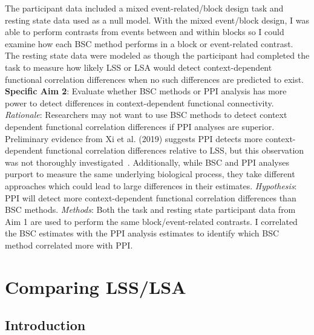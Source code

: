 \documentclass[phd,appendix,figures]{uithesis}
\begin{document}
The participant data included a mixed event-related/block design task and resting
state data used as a null model.
With the mixed event/block design, I was able to perform contrasts from events
between and within blocks so I could examine how each BSC method performs
in a block or event-related contrast.
The resting state data were modeled as though the participant had completed the task
to measure how likely LSS or LSA would detect context-dependent functional correlation
differences when no such differences are predicted to exist.
\newline
\newline
\textbf{Specific Aim 2}: Evaluate whether BSC methods or PPI analysis has
more power to detect differences in context-dependent functional connectivity.
\newline
\newline
\textit{Rationale}: Researchers may not want to use BSC methods
to detect context dependent functional correlation differences if
PPI analyses are superior.
Preliminary evidence from Xi et al. (2019) suggests PPI detects more
context-dependent functional correlation differences relative to LSS,
but this observation was not thoroughly investigated~\cite{Di2019}.
Additionally, while BSC and PPI analyses purport to measure the same underlying
biological process, they take different approaches which could lead to large differences
in their estimates.
\newline
\newline
\textit{Hypothesis}:
PPI will detect more context-dependent functional correlation differences than BSC methods.
\newline
\newline
\textit{Methods}:
Both the task and resting state participant data from Aim 1 are used to perform
the same block/event-related contrasts.
I correlated the BSC estimates with the PPI analysis estimates to identify which BSC method
correlated more with PPI.


\chapter{Comparing LSS/LSA}

\section{Introduction}
\label{intro}
\end{document}
